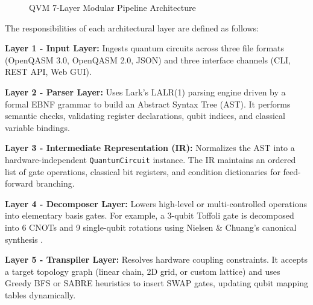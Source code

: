 \begin{figure}[!htb]
{%
}
\caption{QVM 7-Layer Modular Pipeline Architecture}
\label{fig:architecture}
\end{figure}

The responsibilities of each architectural layer are defined as follows:

\textbf{Layer 1 - Input Layer:} Ingests quantum circuits across three file formats (OpenQASM 3.0, OpenQASM 2.0, JSON) and three interface channels (CLI, REST API, Web GUI).

\textbf{Layer 2 - Parser Layer:} Uses Lark's LALR(1) parsing engine \cite{lark2023} driven by a formal EBNF grammar to build an Abstract Syntax Tree (AST). It performs semantic checks, validating register declarations, qubit indices, and classical variable bindings.

\textbf{Layer 3 - Intermediate Representation (IR):} Normalizes the AST into a hardware-independent \texttt{QuantumCircuit} instance. The IR maintains an ordered list of gate operations, classical bit registers, and condition dictionaries for feed-forward branching.

\textbf{Layer 4 - Decomposer Layer:} Lowers high-level or multi-controlled operations into elementary basis gates. For example, a 3-qubit Toffoli gate is decomposed into 6 CNOTs and 9 single-qubit rotations using Nielsen \& Chuang's canonical synthesis \cite{nielsen2010}.

\textbf{Layer 5 - Transpiler Layer:} Resolves hardware coupling constraints. It accepts a target topology graph (linear chain, 2D grid, or custom lattice) and uses Greedy BFS or SABRE \cite{li2019sabre} heuristics to insert SWAP gates, updating qubit mapping tables dynamically.

